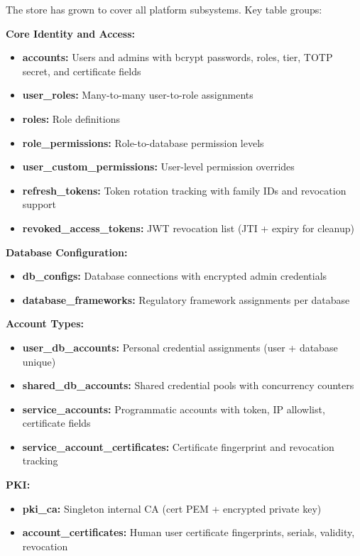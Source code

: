 The store has grown to cover all platform subsystems. Key table groups:

\textbf{Core Identity and Access:}
\begin{itemize}[leftmargin=*]
    \item \textbf{accounts:} Users and admins with bcrypt passwords, roles, tier, TOTP secret, and certificate fields
    \item \textbf{user\_roles:} Many-to-many user-to-role assignments
    \item \textbf{roles:} Role definitions
    \item \textbf{role\_permissions:} Role-to-database permission levels
    \item \textbf{user\_custom\_permissions:} User-level permission overrides
    \item \textbf{refresh\_tokens:} Token rotation tracking with family IDs and revocation support
    \item \textbf{revoked\_access\_tokens:} JWT revocation list (JTI + expiry for cleanup)
\end{itemize}

\textbf{Database Configuration:}
\begin{itemize}[leftmargin=*]
    \item \textbf{db\_configs:} Database connections with encrypted admin credentials
    \item \textbf{database\_frameworks:} Regulatory framework assignments per database
\end{itemize}

\textbf{Account Types:}
\begin{itemize}[leftmargin=*]
    \item \textbf{user\_db\_accounts:} Personal credential assignments (user + database unique)
    \item \textbf{shared\_db\_accounts:} Shared credential pools with concurrency counters
    \item \textbf{service\_accounts:} Programmatic accounts with token, IP allowlist, certificate fields
    \item \textbf{service\_account\_certificates:} Certificate fingerprint and revocation tracking
\end{itemize}

\textbf{PKI:}
\begin{itemize}[leftmargin=*]
    \item \textbf{pki\_ca:} Singleton internal CA (cert PEM + encrypted private key)
    \item \textbf{account\_certificates:} Human user certificate fingerprints, serials, validity, revocation
\end{itemize}

